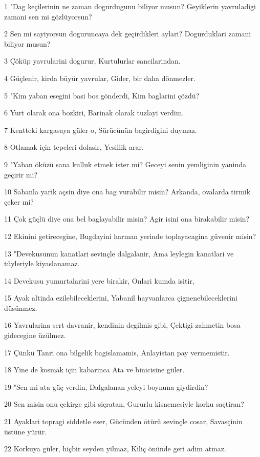 \par 1 "Dag keçilerinin ne zaman dogurdugunu biliyor musun? Geyiklerin yavruladigi zamani sen mi gözlüyorsun?
\par 2 Sen mi sayiyorsun doguruncaya dek geçirdikleri aylari? Dogurduklari zamani biliyor musun?
\par 3 Çöküp yavrularini dogurur, Kurtulurlar sancilarindan.
\par 4 Güçlenir, kirda büyür yavrular, Gider, bir daha dönmezler.
\par 5 "Kim yaban esegini basi bos gönderdi, Kim baglarini çözdü?
\par 6 Yurt olarak ona bozkiri, Barinak olarak tuzlayi verdim.
\par 7 Kentteki kargasaya güler o, Sürücünün bagirdigini duymaz.
\par 8 Otlamak için tepeleri dolasir, Yesillik arar.
\par 9 "Yaban öküzü sana kulluk etmek ister mi? Geceyi senin yemliginin yaninda geçirir mi?
\par 10 Sabanla yarik açsin diye ona bag vurabilir misin? Arkanda, ovalarda tirmik çeker mi?
\par 11 Çok güçlü diye ona bel baglayabilir misin? Agir isini ona birakabilir misin?
\par 12 Ekinini getirecegine, Bugdayini harman yerinde toplayacagina güvenir misin?
\par 13 "Devekusunun kanatlari sevinçle dalgalanir, Ama leylegin kanatlari ve tüyleriyle kiyaslanamaz.
\par 14 Devekusu yumurtalarini yere birakir, Onlari kumda isitir,
\par 15 Ayak altinda ezilebileceklerini, Yabanil hayvanlarca çignenebileceklerini düsünmez.
\par 16 Yavrularina sert davranir, kendinin degilmis gibi, Çektigi zahmetin bosa gidecegine üzülmez.
\par 17 Çünkü Tanri ona bilgelik bagislamamis, Anlayistan pay vermemistir.
\par 18 Yine de kosmak için kabarinca Ata ve binicisine güler.
\par 19 "Sen mi ata güç verdin, Dalgalanan yeleyi boynuna giydirdin?
\par 20 Sen misin onu çekirge gibi siçratan, Gururlu kisnemesiyle korku saçtiran?
\par 21 Ayaklari topragi siddetle eser, Gücünden ötürü sevinçle cosar, Savasçinin üstüne yürür.
\par 22 Korkuya güler, hiçbir seyden yilmaz, Kiliç önünde geri adim atmaz.
